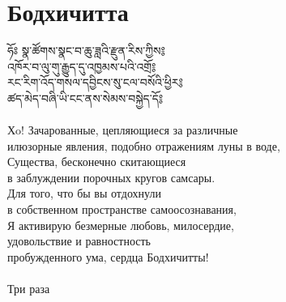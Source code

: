 \newpage

\section{Бодхичитта}

\ti
ཧོཿ སྣ་ཚོགས་སྣང་བ་ཆུ་ཟླའི་རྫུན་རིས་ཀྱིས༔\\
འཁོར་བ་ལུ་གུ་རྒྱུད་དུ་འཁྱམས་པའི་འགྲོ༔\\
རང་རིག་འོད་གསལ་དབྱིངས་སུ་ངལ་བསོའི་ཕྱིར༔\\
ཚད་མེད་བཞི་ཡི་ངང་ནས་སེམས་བསྐྱེད་དོ༔\\
\\
\ru
Хo! Зачарованные, цепляющиеся за различные \\
\indent илюзорные явления, подобно отражениям луны в воде,\\
Существа, бесконечно скитающиеся\\
\indent в заблуждении порочных кругов самсары.\\
Для того, что бы вы отдохнули\\
\indent в собственном пространстве самоосознавания,\\
Я активирую безмерные любовь, милосердие,\\
\indent удовольствие и равностность\\
\indent пробужденного ума, сердца Бодхичитты!\\
\\
Три раза

